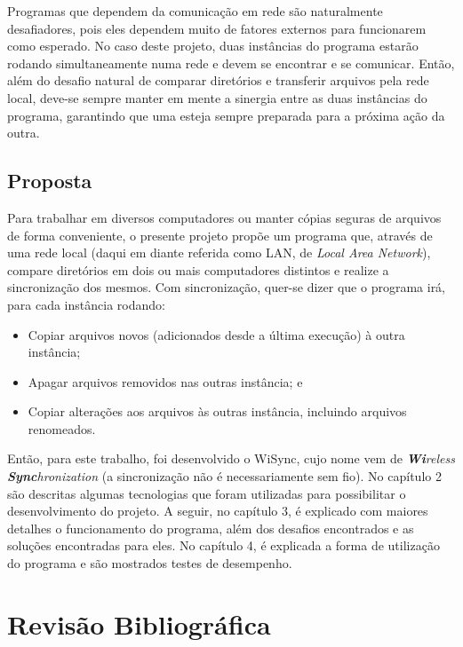 \documentclass[12pt,a4paper]{ufpr}
\begin{document}
Programas que dependem da comunicação em rede são naturalmente desafiadores, pois eles dependem muito de fatores externos para funcionarem como esperado.
No caso deste projeto, duas instâncias do programa estarão rodando simultaneamente numa rede e devem se encontrar e se comunicar.
Então, além do desafio natural de comparar diretórios e transferir arquivos pela rede local, deve-se sempre manter em mente a sinergia entre as duas instâncias do programa, garantindo que uma esteja sempre preparada para a próxima ação da outra.

\section{Proposta}
Para trabalhar em diversos computadores ou manter cópias seguras de arquivos de forma conveniente, o presente projeto propõe um programa que, através de uma rede local (daqui em diante referida como LAN, de \textit{Local Area Network}), compare diretórios em dois ou mais computadores distintos e realize a sincronização dos mesmos.
Com sincronização, quer-se dizer que o programa irá, para cada instância rodando:
\begin{itemize}
    \item Copiar arquivos novos (adicionados desde a última execução) à outra instância;
    \item Apagar arquivos removidos nas outras instância; e
    \item Copiar alterações aos arquivos às outras instância, incluindo arquivos renomeados.
\end{itemize}

Então, para este trabalho, foi desenvolvido o WiSync, cujo nome vem de \textit{\textbf{Wi}reless} \textit{\textbf{Sync}hronization} (a sincronização não é necessariamente sem fio).
No capítulo 2 são descritas algumas tecnologias que foram utilizadas para possibilitar o desenvolvimento do projeto.
A seguir, no capítulo 3, é explicado com maiores detalhes o funcionamento do programa, além dos desafios encontrados e as soluções encontradas para eles.
No capítulo 4, é explicada a forma de utilização do programa e são mostrados testes de desempenho.


\chapter{Revisão Bibliográfica}
\label{revisao}
\end{document}
